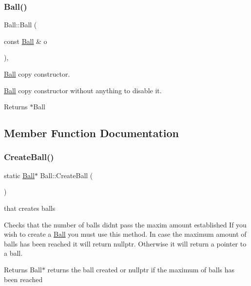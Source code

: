 \subsubsection{\texorpdfstring{Ball()}{Ball()}\hspace{0.1cm}{\footnotesize\ttfamily [2/2]}}
{\footnotesize\ttfamily Ball\+::\+Ball (\begin{DoxyParamCaption}\item[{const \hyperlink{class_ball}{Ball} \&}]{o }\end{DoxyParamCaption})\hspace{0.3cm}{\ttfamily [inline]}, {\ttfamily [protected]}}



\hyperlink{class_ball}{Ball} copy constructor. 

\hyperlink{class_ball}{Ball} copy constructor without anything to disable it.

\begin{DoxyReturn}{Returns}
$\ast$\+Ball 
\end{DoxyReturn}


\subsection{Member Function Documentation}
\mbox{\label{class_ball_a2b93a708ec2a680459ef59979eb8b070}} 
\subsubsection{\texorpdfstring{Create\+Ball()}{CreateBall()}}
{\footnotesize\ttfamily static \hyperlink{class_ball}{Ball}$\ast$ Ball\+::\+Create\+Ball (\begin{DoxyParamCaption}{ }\end{DoxyParamCaption})\hspace{0.3cm}{\ttfamily [static]}}

that creates balls

Checks that the number of balls didn\textquotesingle{}t pass the maxim amount established If you wish to create a \hyperlink{class_ball}{Ball} you must use this method. In case the maximum amount of balls has been reached it will return nullptr. Otherwise it will return a pointer to a ball.

\begin{DoxyReturn}{Returns}
Ball$\ast$ returns the ball created or nullptr if the maximum of balls has been reached 
\end{DoxyReturn}
\mbox{\label{class_ball_a29f8aab00cd8c1211e68926779504bab}} 
